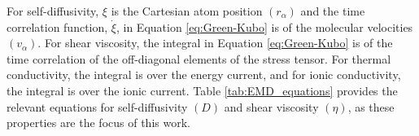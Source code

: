 \documentclass[9pt,bestpractices]{livecoms}
\begin{document}
For self-diffusivity, $\xi$ is the Cartesian atom position $(r_{\alpha})$ and the time correlation function, $\dot{\xi}$, in Equation \ref{eq:Green-Kubo} is of the molecular velocities $(v_{\alpha})$. For shear viscosity, the integral in Equation \ref{eq:Green-Kubo} is of the time correlation of the off-diagonal elements of the stress tensor. For thermal conductivity, the integral is over the energy current, and for ionic conductivity, the integral is over the ionic current. Table \ref{tab:EMD_equations} provides the relevant equations for self-diffusivity $(D)$ and shear viscosity $(\eta)$, as these properties are the focus of this work.



%
\end{document}
